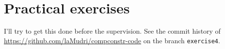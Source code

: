 \documentclass{article}
\begin{document}
\section*{Practical exercises}
I'll try to get this done before the supervision. See the commit history of \url{https://github.com/laMudri/compconstr-code} on the branch \texttt{exercise4}.
\end{document}
